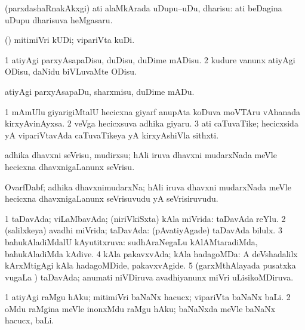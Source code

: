 \bentry
{}
\gl{\sakirx}
\bmng
(parxdashaRnakAkxgi) ati alaMkArada uDupu--uDu, dharisu:  ati beDagina uDupu dharisuva heMgasaru. 
\emng
\eentry

\bentry
{}
\gl{\akirx}
\bmng
(\AtAmx) mitimiVri kUDi; vipariVta kuDi. 
\emng
\eentry

\bentry
{}
\gl{\sakirx}
\bmng
\bnum
\num{1} atiyAgi parxyAsapaDisu, duDisu, duDime mADisu. 
\num{2} kudure \mo vanunx atiyAgi ODisu, daNidu biVLuvaMte ODisu. 
\enum
\emng

\noindent
\gl{\akirx}
\bmng
atiyAgi parxyAsapaDu, sharxmisu, duDime mADu. 
\emng
\eentry

\bentry
{}
\gl{\nA}
\bmng
\bnum
\num{1} mAmUlu giyarigiMtalU  hecicxna giyarf anupAta  koDuva moVTAru vAhanada kirxyAvinAyxsa. 
\num{2} veVga hecicxsuva adhika giyaru.
\num{3} ati caTuvaTike; hecicxsida yA vipariVtavAda caTuvaTikeya yA kirxyAshiVla sithxti. 
\enum
\emng
\eentry

\bentry
{}
\gl{\sakirx}
\bmng
adhika dhavxni seVrisu, mudirxsu; hAli iruva dhavxni mudarxNada meVle hecicxna dhavxnigaLanunx seVrisu. 
\emng
\eentry

\bentry
{}
\gl{\nA}
\bmng
OvarfDabf; adhika dhavxnimudarxNa; hAli iruva dhavxni mudarxNada meVle hecicxna dhavxnigaLanunx seVrisuvudu yA seVrisiruvudu. 
\emng
\eentry

\bentry
{}
\gl{\gu}
\bmng
\bnum
\num{1} taDavAda; viLaMbavAda; (niriVkiSxta) kAla miVrida:  taDavAda reYlu. 
\num{2} (salilxkeya) avadhi miVrida; taDavAda:  (pAvatiyAgade) taDavAda bilulx. 
\num{3} bahukAladiMdalU kAyutitxruva:  sudhAraNegaLu kAlAMtaradiMda, bahukAladiMda kAdive. 
\num{4} kAla pakavxvAda; kAla hadagoMDa:  A deVshadalilx kArxMtigAgi kAla hadagoMDide, pakavxvAgide. 
\num{5} (garxMthAlayada pusatxka \mo vugaLa \vi) taDavAda; anumati niVDiruva avadhiyanunx miVri uLisikoMDiruva. 
\enum
\emng
\eentry

\bentry
{}
\gl{\sakirx}
\bmng
\bnum
\num{1} atiyAgi raMgu hAku; mitimiVri baNaNx hacucx; vipariVta baNaNx baLi. 
\num{2} oMdu raMgina meVle inonxMdu raMgu hAku; baNaNxda meVle baNaNx hacucx, baLi. 
\enum
\emng
\eentry

